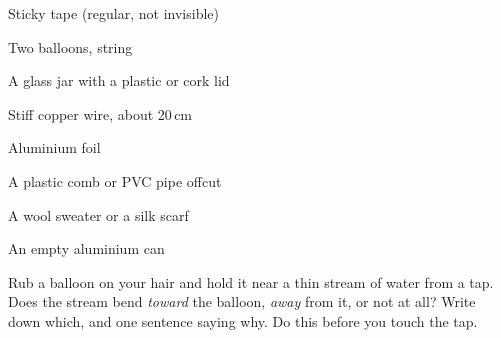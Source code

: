 



\begin{materials}
\item Sticky tape (regular, not invisible)
\item Two balloons, string
\item A glass jar with a plastic or cork lid
\item Stiff copper wire, about 20\,cm
\item Aluminium foil
\item A plastic comb or PVC pipe offcut
\item A wool sweater or a silk scarf
\item An empty aluminium can
\end{materials}

\begin{predict}
Rub a balloon on your hair and hold it near a thin stream of water from a tap.
Does the stream bend \emph{toward} the balloon, \emph{away} from it, or not at
all? Write down which, and one sentence saying why. Do this before you touch the
tap.
\end{predict}

